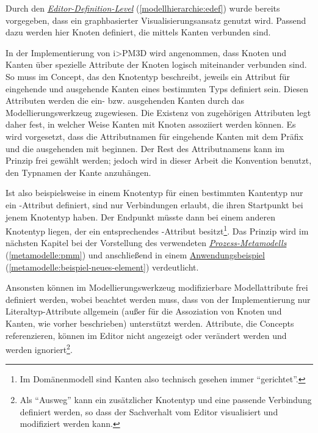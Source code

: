 \documentclass[a4paper,10pt]{sphinxmanual}
\begin{document}
Durch den {\hyperref[modellhierarchie:edef]{\emph{Editor-Definition-Level}}} (\autoref*{modellhierarchie:edef}) wurde bereits vorgegeben, dass ein graphbasierter Visualisierungsansatz genutzt wird.
Passend dazu werden hier Knoten definiert, die mittels Kanten verbunden sind.

In der Implementierung von i\textgreater{}PM3D wird angenommen, dass Knoten und Kanten über spezielle Attribute der Knoten logisch miteinander verbunden sind.
So muss im Concept, das den Knotentyp beschreibt, jeweils ein Attribut für eingehende und ausgehende Kanten eines bestimmten Typs definiert sein.
Diesen Attributen werden die ein- bzw. ausgehenden Kanten durch das Modellierungswerkzeug zugewiesen.
Die Existenz von zugehörigen Attributen legt daher fest, in welcher Weise Kanten mit Knoten assoziiert werden können.
Es wird vorgesetzt, dass die Attributnamen für eingehende Kanten mit dem Präfix  und die ausgehenden mit  beginnen.
Der Rest des Attributnamens kann im Prinzip frei gewählt werden; jedoch wird in dieser Arbeit die Konvention benutzt, den Typnamen der Kante anzuhängen.

Ist also beispielsweise in einem Knotentyp für einen bestimmten Kantentyp nur ein -Attribut definiert, sind nur Verbindungen erlaubt, die ihren Startpunkt bei jenem Knotentyp haben.
Der Endpunkt müsste dann bei einem anderen Knotentyp liegen, der ein entsprechendes -Attribut besitzt\footnote{
Im Domänenmodell sind Kanten also technisch gesehen immer "`gerichtet"'.
}.
Das Prinzip wird im nächsten Kapitel bei der Vorstellung des verwendeten {\hyperref[metamodelle:pmm]{\emph{Prozess-Metamodells}}} (\autoref*{metamodelle:pmm}) und anschließend in einem {\hyperref[metamodelle:beispiel-neues-element]{Anwendungsbeispiel}} (\autoref*{metamodelle:beispiel-neues-element}) verdeutlicht.

Ansonsten können im Modellierungswerkzeug modifizierbare Modellattribute frei definiert werden, wobei beachtet werden muss, dass von der Implementierung nur Literaltyp-Attribute allgemein (außer für die Assoziation von Knoten und Kanten, wie vorher beschrieben) unterstützt werden.
Attribute, die Concepts referenzieren, können im Editor nicht angezeigt oder verändert werden und werden ignoriert\footnote{
Als "`Ausweg"' kann ein zusätzlicher Knotentyp und eine passende Verbindung definiert werden, so dass der Sachverhalt vom Editor visualisiert und modifiziert werden kann.
}.
\end{document}
